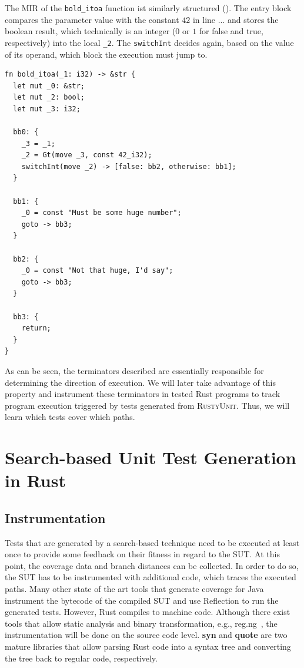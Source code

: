 \documentclass[paper=a4,%
  twoside,%
  BCOR4mm,%
  abstract=true,%
  toc=bibliography,%
  chapterprefix=true,%
  toc=bibliographynumbered,%
  open=right,%
  english,%
  pagesize=pdftex]{scrreprt}
\newcommand{\tech}{\textsc{RustyUnit}\xspace}
\newcommand{\mir}{\ac{MIR}\xspace}
\begin{document}
The \mir of the \texttt{bold\string_itoa} function ist similarly structured (). The entry block compares the parameter value with the constant $42$ in line ... and stores the boolean result, which technically is an integer ($0$ or $1$ for false and true, respectively) into the local \texttt{\string_2}. The \texttt{switchInt} decides again, based on the value of its operand, which block the execution must jump to.  

\begin{lstlisting}[style=boxed, caption={\mir of the \texttt{bold\string_itoa} function}, label=lst:mir-lowered-second]
fn bold_itoa(_1: i32) -> &str {
  let mut _0: &str;                    
  let mut _2: bool;                    
  let mut _3: i32;                     

  bb0: {
    _3 = _1;                         
    _2 = Gt(move _3, const 42_i32);  
    switchInt(move _2) -> [false: bb2, otherwise: bb1]; 
  }

  bb1: {
    _0 = const "Must be some huge number"; 
    goto -> bb3;
  }

  bb2: {
    _0 = const "Not that huge, I'd say";
    goto -> bb3;                     
  }

  bb3: {
    return;                          
  }
}
\end{lstlisting}

As can be seen, the terminators described are essentially responsible for determining the direction of execution. We will later take advantage of this property and instrument these terminators in tested Rust programs to track program execution triggered by tests generated from \tech. Thus, we will learn which tests cover which paths.

\clearpage
\chapter{Search-based Unit Test Generation in Rust}
\label{chap:sbst-in-rust}

\section{Instrumentation}
Tests that are generated by a search-based technique need to be executed at least once to provide some feedback on their fitness in regard to the \ac{SUT}. At this point, the coverage data and branch distances can be collected. In order to do so, the \ac{SUT} has to be instrumented with additional code, which traces the executed paths. Many other state of the art tools that generate coverage for Java instrument the bytecode of the compiled \ac{SUT} and use Reflection to run the generated tests. However, Rust compiles to machine code. Although there exist tools that allow static analysis and binary transformation, e.g., reg.ng~\cite{DiFederico2018}, the instrumentation will be done on the source code level. \textbf{syn} and \textbf{quote} are two mature libraries that allow parsing Rust code into a syntax tree and converting the tree back to regular code, respectively.
\end{document}
